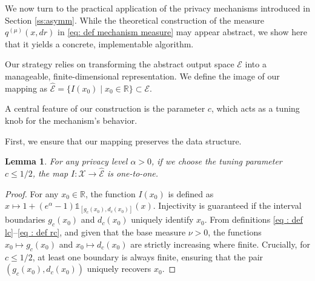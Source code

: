 \documentclass[a4paper, 11pt]{article}
\newtheorem{lemma}{Lemma}
\theoremstyle{definition}
\newcommand{\indi}[1]{\mathds{1}_{#1}}
\begin{document}
{We now turn to the practical application of the privacy mechanisms introduced in Section \ref{ss:asymm}. While the theoretical construction of the measure $q^{(\mu)}(x,dr)$ in \eqref{eq: def mechanism measure} may appear abstract, we show here that it yields a concrete, implementable algorithm.

Our strategy relies on transforming the abstract output space $\mathcal{E}$ into a manageable, finite-dimensional representation. We define the image of our mapping as $\widehat{\mathcal{E}}=\{I(x_0) \mid x_0\in \mathbb{R}\} \subset \mathcal{E}$.

A central feature of our construction is the parameter $c$, which acts as a tuning knob for the mechanism's behavior. %


First, we ensure that our mapping preserves the data structure.
\begin{lemma}
	For any privacy level $\alpha>0$, if we choose the tuning parameter $c \le 1/2$, the map $I : \mathcal{X} \to \widehat{\mathcal{E}}$ is one-to-one.
\end{lemma}

\begin{proof}
	For any $x_0 \in \mathbb{R}$, the function $I(x_0)$ is defined as $x\mapsto 1 + (e^\alpha-1) \indi{[g_c(x_0),d_c(x_0)]}(x)$.
    Injectivity is guaranteed if the interval boundaries $g_c(x_0)$ and $d_c(x_0)$ uniquely identify $x_0$.
	From definitions \eqref{eq : def lc}--\eqref{eq : def rc}, and given that the base measure $\nu>0$, the functions $x_0 \mapsto g_c(x_0)$ and $x_0 \mapsto d_c(x_0)$ are strictly increasing where finite.
    Crucially, for $c\le 1/2$, at least one boundary is always finite, ensuring that the pair $(g_c(x_0),d_c(x_0))$ uniquely recovers $x_0$.
\end{proof}

}
\end{document}
